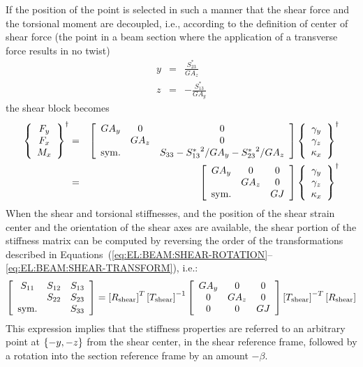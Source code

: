 If the position of the point is selected in such a manner 
that the shear force and the torsional moment are decoupled, i.e.,
according to the definition of center of shear force (the point 
in a beam section where the application of a transverse force
results in no twist)
\begin{eqnarray*}
	y & = & \frac{S_{23}^*}{GA_z} \\
	z & = & -\frac{S_{13}^*}{GA_y}
\end{eqnarray*}
the shear block becomes
\begin{eqnarray*}
	\cubr{\cvvect{
		F_y \\
		F_x \\
		M_x
	}}^{\dagger}
	& = &
	\sqbr{\matr{ccc}{
		GA_y & 0 & 0 \\
		& GA_z & 0 \\
		\llk{sym.} &  & S_{33} - {S_{13}^*}^2/GA_y - {S_{23}^*}^2/GA_z
	}}\cubr{\cvvect{
		\gamma_y \\
		\gamma_z \\
		\kappa_x
	}}^{\dagger}
	\\
	& = &
	\sqbr{\matr{ccc}{
		GA_y & 0 & 0 \\
		& GA_z & 0 \\
		\llk{sym.} &  & GJ
	}}\cubr{\cvvect{
		\gamma_y \\
		\gamma_z \\
		\kappa_x
	}}^{\dagger}
\end{eqnarray*}
When the shear and torsional stiffnesses, and the position 
of the shear strain center and the orientation of the shear axes
are available, the shear portion of the stiffness matrix 
can be computed by reversing the order of the transformations 
described in
Equations~(\ref{eq:EL:BEAM:SHEAR-ROTATION}--\ref{eq:EL:BEAM:SHEAR-TRANSFORM}),
i.e.:
\begin{equation}
	\sqbr{\matr{ccc}{
		S_{11} & S_{12} & S_{13} \\
		& S_{22} & S_{23} \\
		\llk{sym.} & & S_{33}
	}} = \sqbr{R_{\llk{shear}}}^T \sqbr{T_{\llk{shear}}}^{-1} \sqbr{\matr{ccc}{
		GA_y & 0 & 0 \\
		0 & GA_z & 0 \\
		0 & 0 & GJ
	}} \sqbr{T_{\llk{shear}}}^{-T} \sqbr{R_{\llk{shear}}}
	\label{eq:EL:BEAM:SHEAR-TRANSFORM-REVERSED}
\end{equation}
This expression implies that the stiffness properties are referred
to an arbitrary point at $\cubr{-y,-z}$ from the shear center,
in the shear reference frame, followed by a rotation
into the section reference frame by an amount $-\beta$.
